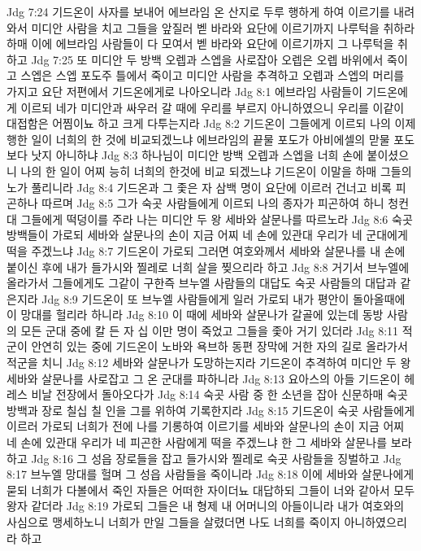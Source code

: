 Jdg 7:24  기드온이 사자를 보내어 에브라임 온 산지로 두루 행하게 하여 이르기를 내려와서 미디안 사람을 치고 그들을 앞질러 벧 바라와 요단에 이르기까지 나루턱을 취하라 하매 이에 에브라임 사람들이 다 모여서 벧 바라와 요단에 이르기까지 그 나루턱을 취하고
Jdg 7:25  또 미디안 두 방백 오렙과 스엡을 사로잡아 오렙은 오렙 바위에서 죽이고 스엡은 스엡 포도주 틀에서 죽이고 미디안 사람을 추격하고 오렙과 스엡의 머리를 가지고 요단 저편에서 기드온에게로 나아오니라
Jdg 8:1  에브라임 사람들이 기드온에게 이르되 네가 미디안과 싸우러 갈 때에 우리를 부르지 아니하였으니 우리를 이같이 대접함은 어찜이뇨 하고 크게 다투는지라
Jdg 8:2  기드온이 그들에게 이르되 나의 이제 행한 일이 너희의 한 것에 비교되겠느냐 에브라임의 끝물 포도가 아비에셀의 맏물 포도보다 낫지 아니하냐
Jdg 8:3  하나님이 미디안 방백 오렙과 스엡을 너희 손에 붙이셨으니 나의 한 일이 어찌 능히 너희의 한것에 비교 되겠느냐 기드온이 이말을 하매 그들의 노가 풀리니라
Jdg 8:4  기드온과 그 좇은 자 삼백 명이 요단에 이르러 건너고 비록 피곤하나 따르며
Jdg 8:5  그가 숙곳 사람들에게 이르되 나의 종자가 피곤하여 하니 청컨대 그들에게 떡덩이를 주라 나는 미디안 두 왕 세바와 살문나를 따르노라
Jdg 8:6  숙곳 방백들이 가로되 세바와 살문나의 손이 지금 어찌 네 손에 있관대 우리가 네 군대에게 떡을 주겠느냐
Jdg 8:7  기드온이 가로되 그러면 여호와께서 세바와 살문나를 내 손에 붙이신 후에 내가 들가시와 찔레로 너희 살을 찢으리라 하고
Jdg 8:8  거기서 브누엘에 올라가서 그들에게도 그같이 구한즉 브누엘 사람들의 대답도 숙곳 사람들의 대답과 같은지라
Jdg 8:9  기드온이 또 브누엘 사람들에게 일러 가로되 내가 평안이 돌아올때에 이 망대를 헐리라 하니라
Jdg 8:10  이 때에 세바와 살문나가 갈골에 있는데 동방 사람의 모든 군대 중에 칼 든 자 십 이만 명이 죽었고 그들을 좇아 거기 있더라
Jdg 8:11  적군이 안연히 있는 중에 기드온이 노바와 욕브하 동편 장막에 거한 자의 길로 올라가서 적군을 치니
Jdg 8:12  세바와 살문나가 도망하는지라 기드온이 추격하여 미디안 두 왕 세바와 살문나를 사로잡고 그 온 군대를 파하니라
Jdg 8:13  요아스의 아들 기드온이 헤레스 비날 전장에서 돌아오다가
Jdg 8:14  숙곳 사람 중 한 소년을 잡아 신문하매 숙곳 방백과 장로 칠십 칠 인을 그를 위하여 기록한지라
Jdg 8:15  기드온이 숙곳 사람들에게 이르러 가로되 너희가 전에 나를 기롱하여 이르기를 세바와 살문나의 손이 지금 어찌 네 손에 있관대 우리가 네 피곤한 사람에게 떡을 주겠느냐 한 그 세바와 살문나를 보라하고
Jdg 8:16  그 성읍 장로들을 잡고 들가시와 찔레로 숙곳 사람들을 징벌하고
Jdg 8:17  브누엘 망대를 헐며 그 성읍 사람들을 죽이니라
Jdg 8:18  이에 세바와 살문나에게 묻되 너희가 다볼에서 죽인 자들은 어떠한 자이더뇨 대답하되 그들이 너와 같아서 모두 왕자 같더라
Jdg 8:19  가로되 그들은 내 형제 내 어머니의 아들이니라 내가 여호와의 사심으로 맹세하노니 너희가 만일 그들을 살렸더면 나도 너희를 죽이지 아니하였으리라 하고
